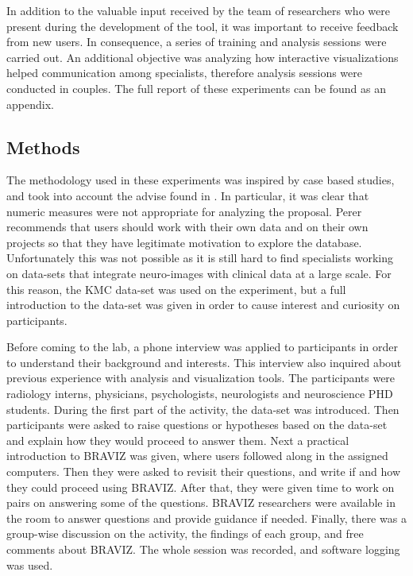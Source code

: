 In addition to the valuable input received by the team of researchers who were present during the development of the tool, it was important to receive feedback from new users. In consequence, a series of training and analysis sessions were carried out. An additional objective was analyzing how interactive visualizations helped communication among specialists, therefore analysis sessions were conducted in couples. The full report of these experiments can be found as an appendix. 

\subsection{Methods}

The methodology used in these experiments was inspired by case based studies, and took into account the advise found in \autocite{lam_seven_2011}. In particular, it was clear that numeric measures were not appropriate for analyzing the proposal. Perer \autocite{perer_integrating_2008} recommends that users should work with their own data and on their own projects so that they have legitimate motivation to explore the database. Unfortunately this was not possible as it is still hard to find specialists working on data-sets that integrate neuro-images with clinical data at a large scale. For this reason, the KMC data-set was used on the experiment, but a full introduction to the data-set was given in order to cause interest and curiosity on participants. 

Before coming to the lab, a phone interview was applied to participants in order to understand their background and interests. This interview also inquired about previous experience with analysis and visualization tools. The participants were radiology interns, physicians, psychologists, neurologists and neuroscience PHD students. During the first part of the activity, the data-set was introduced. Then participants were asked to raise questions or hypotheses based on the data-set and explain how they would proceed to answer them. Next a practical introduction to BRAVIZ was given, where users followed along in the assigned computers. Then they were asked to revisit their questions, and write if and how they could proceed using BRAVIZ. After that, they were given time to work on pairs on answering some of the questions. BRAVIZ researchers were available in the room to answer questions and provide guidance if needed. Finally, there was a group-wise discussion on the activity, the findings of each group, and free comments about BRAVIZ. The whole session was recorded, and software logging was used. 


